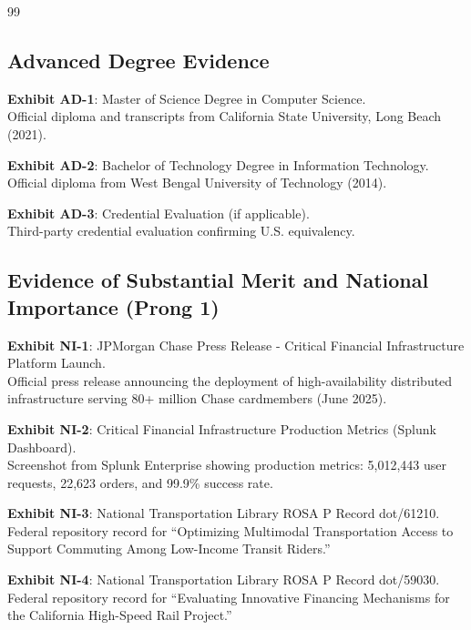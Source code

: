 \documentclass[11pt]{article}
\begin{document}
\begin{thebibliography}{99}

\subsection*{Advanced Degree Evidence}

\textbf{Exhibit AD-1}: Master of Science Degree in Computer Science.\\
Official diploma and transcripts from California State University, Long Beach (2021).

\textbf{Exhibit AD-2}: Bachelor of Technology Degree in Information Technology.\\
Official diploma from West Bengal University of Technology (2014).

\textbf{Exhibit AD-3}: Credential Evaluation (if applicable).\\
Third-party credential evaluation confirming U.S. equivalency.

\subsection*{Evidence of Substantial Merit and National Importance (Prong 1)}

\textbf{Exhibit NI-1}: JPMorgan Chase Press Release - Critical Financial Infrastructure Platform Launch.\\
Official press release announcing the deployment of high-availability distributed infrastructure serving 80+ million Chase cardmembers (June 2025).

\textbf{Exhibit NI-2}: Critical Financial Infrastructure Production Metrics (Splunk Dashboard).\\
Screenshot from Splunk Enterprise showing production metrics: 5,012,443 user requests, 22,623 orders, and 99.9\% success rate.

\textbf{Exhibit NI-3}: National Transportation Library ROSA P Record dot/61210.\\
Federal repository record for ``Optimizing Multimodal Transportation Access to Support Commuting Among Low-Income Transit Riders.''

\textbf{Exhibit NI-4}: National Transportation Library ROSA P Record dot/59030.\\
Federal repository record for ``Evaluating Innovative Financing Mechanisms for the California High-Speed Rail Project.''


\end{thebibliography}
\end{document}
